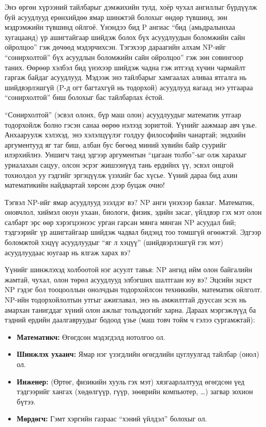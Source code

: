 Энэ өргөн хүрээний тайлбарыг дэмжихийн тулд, хоёр чухал ангиллыг бүрдүүлж буй асуудлууд ерөнхийдөө ямар шинжтэй болохыг өндөр түвшинд, зөн мэдрэмжийн түвшинд ойлгоё. Үнэндээ бид P ангиас “бид (амьдралынхаа хугацаанд) үр ашигтайгаар шийдэж болох бүх асуудлуудын боломжийн сайн ойролцоо” гэж дөчөөд мэдэрчихсэн. Тэгэхээр дараагийн алхам NP-ийг “сонирхолтой” бүх асуудлын боломжийн сайн ойролцоо” гэж зөн совингоор таних. Өөрөөр хэлбэл бид үнэхээр шийдэж чадна гэж итгээд хүчин чармайлт гаргаж байдаг асуудлууд. Мэдээж энэ тайлбарыг хамгаалах аливаа ятгалга нь шийдвэрлэшгүй (P-д огт багтахгүй нь тодорхой) асуудлууд яагаад энэ утгаараа “сонирхолтой” биш болохыг бас тайлбарлах ёстой.


“Сонирхолтой” (эсвэл олонх, бүр маш олон) асуудлуудыг математик утгаар тодорхойлж болно гэсэн санаа өөрөө нэлээд зоригтой. Үүнийг аажмаар авч үзье. Анхааруулж хэлэхэд, энэ хэлэлцүүлэг голдуу философийн чанартай; эндхийн аргументууд яг таг биш, албан бус бөгөөд миний хувийн байр суурийг илэрхийлнэ. Уншигч танд эдгээр аргументын “цагаан толбо”-ыг олж харахыг уриалахын сацуу, олсон эсрэг жишээнүүд тань ердийнх үү, эсвэл онцгой тохиолдол уу гэдгийг эргэцүүлж үзэхийг бас хүсье. Үүний дараа бид ахин математикийн найдвартай хөрсөн дээр буцаж очно!


Тэгвэл NP-ийг ямар асуудлууд эзэлдэг вэ? NP анги үнэхээр баялаг. Математик, оновчлол, хиймэл оюун ухаан, биологи, физик, эдийн засаг, үйлдвэр гэх мэт олон салбарт эрс өөр хэрэгцээнээс урган гарсан мянга мянган NP асуудал бий; тэдгээрийг үр ашигтайгаар шийдэж чадвал бидэнд тоо томшгүй өгөөжтэй. Эдгээр боломжтой хэцүү асуудлуудыг “яг л хэцүү” (шийдвэрлэшгүй гэх мэт) асуудлуудаас юугаар нь ялгаж харах вэ?


Үүнийг шинжлэхэд холбоотой нэг асуулт тавья: NP ангид ийм олон байгалийн жамтай, чухал, олон төрөл асуудлууд элбэгших шалтгаан юу вэ? Эцсийн эцэст NP гэдэг бол тооцооллын онолчдын тодорхойлсон техникийн, математик ойлголт. NP-ийн тодорхойлолтын утгыг ажиглавал, энэ нь амжилттай дууссан эсэх нь амархан танигддаг хүний олон ажлыг тольддогийг харна. Дараах мэргэжлүүд ба тэдний ердийн даалгавруудыг бодоод үзье (маш товч тойм ч гэлээ сургамжтай):


\begin{itemize}
  \item \textbf{Математикч:} Өгөгдсөн мэдэгдэлд нотолгоо ол.
  \item \textbf{Шинжлэх ухаанч:} Ямар нэг үзэгдлийн өгөгдлийн цуглуулгад тайлбар (онол) ол.
  \item \textbf{Инженер:} (Өртөг, физикийн хууль гэх мэт) хязгаарлалтууд өгөгдсөн үед тэдгээрийг хангах (хөдөлгүүр, гүүр, зөөврийн компьютер, …) загвар зохион бүтээ.
  \item \textbf{Мөрдөгч:} Гэмт хэргийн газраас “хэний үйлдэл” болохыг ол.
\end{itemize}


